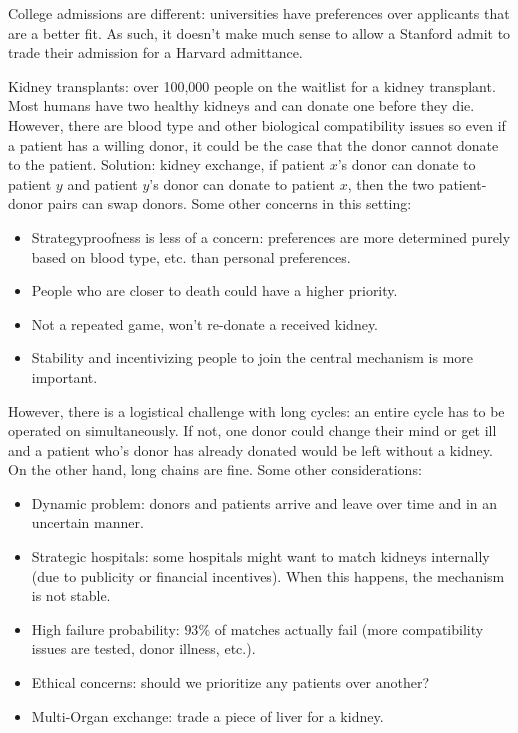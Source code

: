 \documentclass[dvipsnames]{article}
\theoremstyle{definition}
\theoremstyle{remark}
\begin{document}
College admissions are different: universities have preferences over applicants that are a better fit. As such, it doesn't make much sense to allow a Stanford admit to trade their admission for a Harvard admittance. 

Kidney transplants: over 100,000 people on the waitlist for a kidney transplant. Most humans have two healthy kidneys and can donate one before they die. However, there are blood type and other biological compatibility issues so even if a patient has a willing donor, it could be the case that the donor cannot donate to the patient. Solution: kidney exchange, if patient $x$'s donor can donate to patient $y$ and patient $y$'s donor can donate to patient $x$, then the two patient-donor pairs can swap donors. Some other concerns in this setting:
\begin{itemize}
	\item Strategyproofness is less of a concern: preferences are more determined purely based on blood type, etc. than personal preferences. 
	\item People who are closer to death could have a higher priority.
	\item Not a repeated game, won't re-donate a received kidney.
	\item Stability and incentivizing people to join the central mechanism is more important.   
\end{itemize}
However, there is a logistical challenge with long cycles: an entire cycle has to be operated on simultaneously. If not, one donor could change their mind or get ill and a patient who's donor has already donated would be left without a kidney. On the other hand, long chains are fine. Some other considerations:
\begin{itemize}
	\item Dynamic problem: donors and patients arrive and leave over time and in an uncertain manner.
	\item Strategic hospitals: some hospitals might want to match kidneys internally (due to publicity or financial incentives). When this happens, the mechanism is not stable.
	\item High failure probability: $93\%$ of matches actually fail (more compatibility issues are tested, donor illness, etc.).
	\item Ethical concerns: should we prioritize any patients over another?
	\item Multi-Organ exchange: trade a piece of liver for a kidney. 
\end{itemize}
\end{document}
